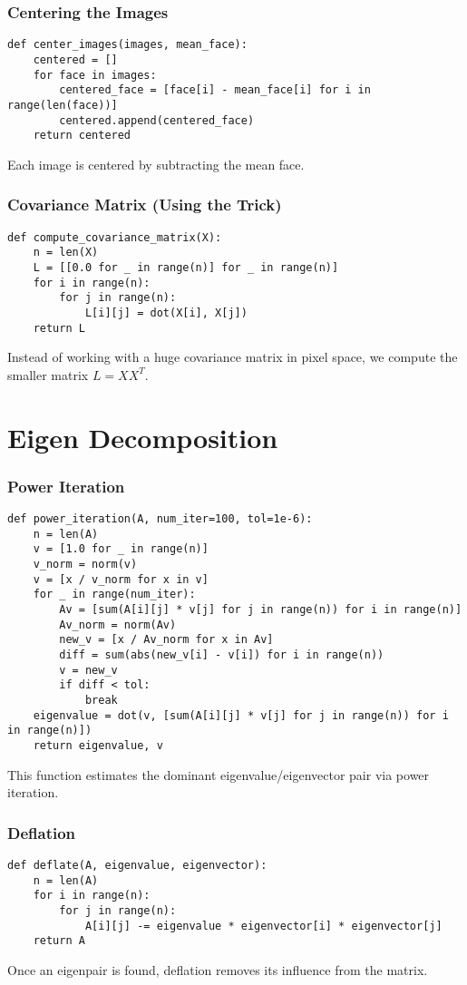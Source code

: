 \documentclass{beamer}
\begin{document}
\begin{frame}[fragile]
  \frametitle{Centering the Images}
  \begin{lstlisting}
def center_images(images, mean_face):
    centered = []
    for face in images:
        centered_face = [face[i] - mean_face[i] for i in range(len(face))]
        centered.append(centered_face)
    return centered
  \end{lstlisting}
  Each image is centered by subtracting the mean face.
\end{frame}

\begin{frame}[fragile]
  \frametitle{Covariance Matrix (Using the Trick)}
  \begin{lstlisting}
def compute_covariance_matrix(X):
    n = len(X)
    L = [[0.0 for _ in range(n)] for _ in range(n)]
    for i in range(n):
        for j in range(n):
            L[i][j] = dot(X[i], X[j])
    return L
  \end{lstlisting}
  Instead of working with a huge covariance matrix in pixel space, we compute the smaller matrix \(L = XX^T\).
\end{frame}

\section{Eigen Decomposition}

\begin{frame}[fragile]
  \frametitle{Power Iteration}
  \begin{lstlisting}
def power_iteration(A, num_iter=100, tol=1e-6):
    n = len(A)
    v = [1.0 for _ in range(n)]
    v_norm = norm(v)
    v = [x / v_norm for x in v]
    for _ in range(num_iter):
        Av = [sum(A[i][j] * v[j] for j in range(n)) for i in range(n)]
        Av_norm = norm(Av)
        new_v = [x / Av_norm for x in Av]
        diff = sum(abs(new_v[i] - v[i]) for i in range(n))
        v = new_v
        if diff < tol:
            break
    eigenvalue = dot(v, [sum(A[i][j] * v[j] for j in range(n)) for i in range(n)])
    return eigenvalue, v
  \end{lstlisting}
  This function estimates the dominant eigenvalue/eigenvector pair via power iteration.
\end{frame}

\begin{frame}[fragile]
  \frametitle{Deflation}
  \begin{lstlisting}
def deflate(A, eigenvalue, eigenvector):
    n = len(A)
    for i in range(n):
        for j in range(n):
            A[i][j] -= eigenvalue * eigenvector[i] * eigenvector[j]
    return A
  \end{lstlisting}
  Once an eigenpair is found, deflation removes its influence from the matrix.
\end{frame}
\end{document}
